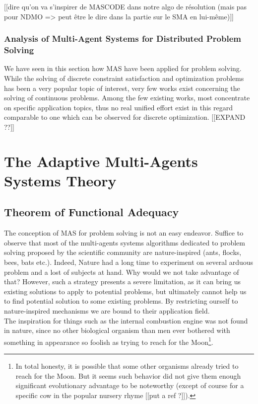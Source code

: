 [[dire qu'on va s'inspirer de MASCODE dans notre algo de résolution (mais pas pour NDMO => peut être le dire dans la partie sur le SMA en lui-même)]]

\subsubsection{Analysis of Multi-Agent Systems for Distributed Problem Solving}

We have seen in this section how MAS have been applied for problem solving. While the solving of discrete constraint satisfaction and optimization problems has been a very popular topic of interest, very few works exist concerning the solving of continuous problems. Among the few existing works, most concentrate on specific application topics, thus no real unified effort exist in this regard comparable to one which can be observed for discrete optimization.
[[EXPAND ??]]

\section{The Adaptive Multi-Agents Systems Theory}\label{amas_theory}

\subsection{Theorem of Functional Adequacy}

The conception of MAS for problem solving is not an easy endeavor. Suffice to observe that most of the multi-agents systems algorithms dedicated to problem solving proposed by the scientific community are nature-inspired (ants, flocks, bees, bats etc.). Indeed, Nature had a long time to experiment on several arduous problem and a lost of subjects at hand. Why would we not take advantage of that? However, such a strategy presents a severe limitation, as it can bring us existing solutions to apply to potential problems, but ultimately cannot help us to find potential solution to some existing problems. By restricting ourself to nature-inspired mechanisms we are bound to their application field.\\
The inspiration for things such as the internal combustion engine was not found in nature, since no other biological organism than men ever bothered with something in appearance so foolish as trying to reach for the Moon\footnote{In total honesty, it is possible that some other organisms already tried to reach for the Moon. But it seems such behavior did not give them enough significant evolutionary advantage to be noteworthy (except of course for a specific cow in the popular nursery rhyme [[put a ref ?]]).}.


